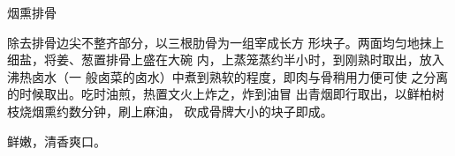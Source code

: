 \begin{recipe}{烟熏排骨}

\ingredients




\cooking

除去排骨边尖不整齐部分，以三根肋骨为一组宰成长方 形块子。两面均匀地抹上细盐，将姜、葱置排骨上盛在大碗 内，上蒸笼蒸约半小时，到刚熟时取出，放入沸热卤水（一 般卤菜的卤水）中煮到熟软的程度，即肉与骨稍用力便可使 之分离的时候取出。吃时油煎，热置文火上炸之，炸到油冒 出青烟即行取出，以鲜柏树枝烧烟熏约数分钟，刷上麻油， 砍成骨牌大小的块子即成。

\notes

鲜嫩，清香爽口。

\end{recipe}

